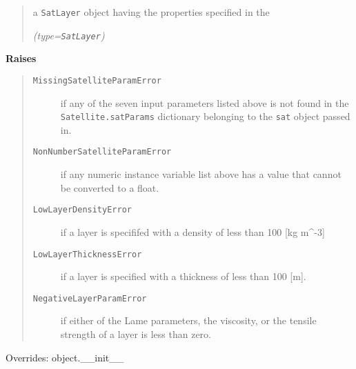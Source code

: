 \begin{boxedminipage}{\funcwidth}
      \begin{quote}
      a \texttt{SatLayer} object having the properties specified in the

      {\it (type=\texttt{SatLayer})}

      \end{quote}

      \textbf{Raises}
    \vspace{-1ex}

      \begin{quote}
        \begin{description}

          \item[\texttt{MissingSatelliteParamError}]

          if any of the seven input parameters listed above is not found in
          the \texttt{Satellite.satParams} dictionary belonging to the 
          \texttt{sat} object passed in.

          \item[\texttt{NonNumberSatelliteParamError}]

          if any numeric instance variable list above has a value that 
          cannot be converted to a float.

          \item[\texttt{LowLayerDensityError}]

          if a layer is specififed with a density of less than 100 [kg 
          m{\textasciicircum}-3]

          \item[\texttt{LowLayerThicknessError}]

          if a layer is specified with a thickness of less than 100 [m].

          \item[\texttt{NegativeLayerParamError}]

          if either of the Lame parameters, the viscosity, or the tensile 
          strength of a layer is less than zero.

        \end{description}

      \end{quote}

      Overrides: object.\_\_init\_\_

    \end{boxedminipage}

    \vspace{0.5ex}

